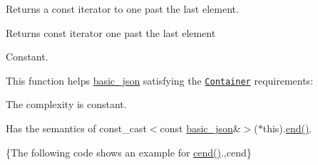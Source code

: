 Returns a const iterator to one past the last element.

 \begin{DoxyReturn}{Returns}
const iterator one past the last element
\end{DoxyReturn}
Constant.

This function helps {\ttfamily \hyperlink{classnlohmann_1_1basic__json}{basic\-\_\-json}} satisfying the \href{http://en.cppreference.com/w/cpp/concept/Container}{\tt Container} requirements\-:
\begin{DoxyItemize}
\item The complexity is constant.
\item Has the semantics of {\ttfamily const\-\_\-cast$<$const \hyperlink{classnlohmann_1_1basic__json}{basic\-\_\-json}\&$>$($\ast$this).\hyperlink{classnlohmann_1_1basic__json_a12ccf14d39ddae52f6c7e126105a230b}{end()}}.
\end{DoxyItemize}

\{The following code shows an example for {\ttfamily \hyperlink{classnlohmann_1_1basic__json_aa730d68d55ccc48d2cd4835ff46d2a0f}{cend()}}.,cend\}

